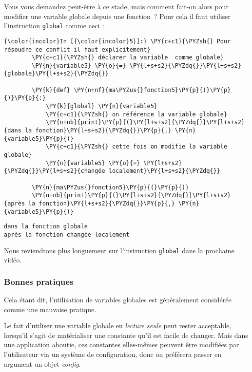     Vous vous demandez peut-être à ce stade, mais comment fait-on alors pour
modifier une variable globale depuis une fonction~? Pour cela il faut
utiliser l'instruction \texttt{global} comme ceci~:

    \begin{Verbatim}[commandchars=\\\{\},frame=single,framerule=0.3mm,rulecolor=\color{cellframecolor}]
{\color{incolor}In [{\color{incolor}5}]:} \PY{c+c1}{\PYZsh{} Pour résoudre ce conflit il faut explicitement}
        \PY{c+c1}{\PYZsh{} déclarer la variable  comme globale}
        \PY{n}{variable5} \PY{o}{=} \PY{l+s+s2}{\PYZdq{}}\PY{l+s+s2}{globale}\PY{l+s+s2}{\PYZdq{}}
        
        \PY{k}{def} \PY{n+nf}{ma\PYZus{}fonction5}\PY{p}{(}\PY{p}{)}\PY{p}{:}
            \PY{k}{global} \PY{n}{variable5}
            \PY{c+c1}{\PYZsh{} on référence la variable globale}
            \PY{n+nb}{print}\PY{p}{(}\PY{l+s+s2}{\PYZdq{}}\PY{l+s+s2}{dans la fonction}\PY{l+s+s2}{\PYZdq{}}\PY{p}{,} \PY{n}{variable5}\PY{p}{)}
            \PY{c+c1}{\PYZsh{} cette fois on modifie la variable globale}
            \PY{n}{variable5} \PY{o}{=} \PY{l+s+s2}{\PYZdq{}}\PY{l+s+s2}{changée localement}\PY{l+s+s2}{\PYZdq{}}
        
        \PY{n}{ma\PYZus{}fonction5}\PY{p}{(}\PY{p}{)}
        \PY{n+nb}{print}\PY{p}{(}\PY{l+s+s2}{\PYZdq{}}\PY{l+s+s2}{après la fonction}\PY{l+s+s2}{\PYZdq{}}\PY{p}{,} \PY{n}{variable5}\PY{p}{)}
\end{Verbatim}


    \begin{Verbatim}[commandchars=\\\{\},frame=single,framerule=0.3mm,rulecolor=\color{cellframecolor}]
dans la fonction globale
après la fonction changée localement
\end{Verbatim}

    Nous reviendrons plus longuement sur l'instruction \texttt{global} dans
la prochaine vidéo.

    \hypertarget{bonnes-pratiques}{%
\subsubsection{Bonnes pratiques}\label{bonnes-pratiques}}

    Cela étant dit, l'utilisation de variables globales est généralement
considérée comme une mauvaise pratique.

Le fait d'utiliser une variable globale en \emph{lecture seule} peut
rester acceptable, lorsqu'il s'agit de matérialiser une constante qu'il
est facile de changer. Mais dans une application aboutie, ces constantes
elles-mêmes peuvent être modifiées par l'utilisateur via un système de
configuration, donc on préférera passer en argument un objet
\emph{config}.

